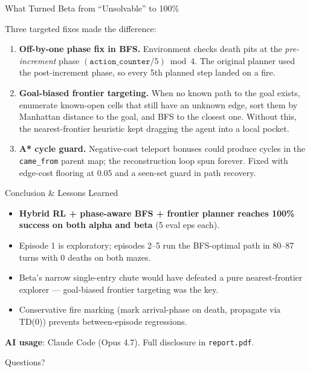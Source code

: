 \documentclass[aspectratio=169]{beamer}
\begin{document}
\begin{frame}{What Turned Beta from ``Unsolvable'' to 100\%}

Three targeted fixes made the difference:

\begin{enumerate}
\item \textbf{Off-by-one phase fix in BFS.}  Environment checks death pits at the \emph{pre-increment} phase $(\texttt{action\_counter}\slash 5)\bmod 4$.  The original planner used the post-increment phase, so every 5th planned step landed on a fire.
\item \textbf{Goal-biased frontier targeting.}  When no known path to the goal exists, enumerate known-open cells that still have an unknown edge, sort them by Manhattan distance to the goal, and BFS to the closest one.  Without this, the nearest-frontier heuristic kept dragging the agent into a local pocket.
\item \textbf{A* cycle guard.}  Negative-cost teleport bonuses could produce cycles in the \texttt{came\_from} parent map; the reconstruction loop spun forever.  Fixed with edge-cost flooring at $0.05$ and a seen-set guard in path recovery.
\end{enumerate}

\end{frame}

\begin{frame}{Conclusion \& Lessons Learned}

\begin{itemize}
\item \textbf{Hybrid RL + phase-aware BFS + frontier planner reaches 100\% success on both alpha and beta} (5 eval eps each).
\item Episode 1 is exploratory; episodes 2--5 run the BFS-optimal path in 80--87 turns with 0 deaths on both mazes.
\item Beta's narrow single-entry chute would have defeated a pure nearest-frontier explorer --- goal-biased frontier targeting was the key.
\item Conservative fire marking (mark arrival-phase on death, propagate via TD(0)) prevents between-episode regressions.
\end{itemize}

\vspace{0.3cm}

\textbf{AI usage}: Claude Code (Opus 4.7). Full disclosure in \texttt{report.pdf}.

\vspace{0.5cm}

\centering
\Large Questions?

\end{frame}
\end{document}
